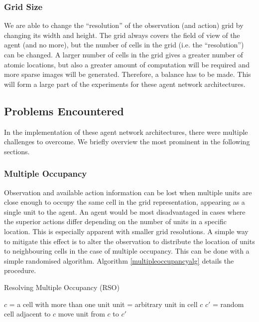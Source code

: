 \subsubsection{Grid Size}

We are able to change the ``resolution'' of the observation (and action) grid by changing its width and height. The grid always covers the field of view of the agent (and no more), but the number of cells in the grid (i.e. the ``resolution'') can be changed.  A larger number of cells in the grid gives a greater number of atomic locations, but also a greater amount of computation will be required and more sparse images will be generated. Therefore, a balance has to be made. This will form a large part of the experiments for these agent network architectures.





\subsection{Problems Encountered}
In the implementation of these agent network architectures, there were multiple challenges to overcome. We briefly overview the most prominent in the following sections.

\subsubsection{Multiple Occupancy}
Observation and available action information can be lost when multiple units are close enough to occupy the same cell in the grid representation, appearing as a single unit to the agent. An agent would be most disadvantaged in cases where the superior actions differ depending on the number of units in a specific location. This is especially apparent with smaller grid resolutions. A simple way to mitigate this effect is to alter the observation to distribute the location of units to neighbouring cells in the case of multiple occupancy. This can be done with a simple randomised algorithm. Algorithm \ref{multipleoccupancyalg} details the procedure.

\begin{algorithm}
    \caption{Resolving Multiple Occupancy (RSO)}
    \label{multipleoccupancyalg}
    \begin{algorithmic}
        \State $c$ = a cell with more than one unit
        \State unit = arbitrary unit in cell $c$
        \State $c'$ = random cell adjacent to $c$
        \State move unit from $c$ to $c'$
        \EndWhile
        
        \EndProcedure
      
        
        
    \end{algorithmic}
    
\end{algorithm}

